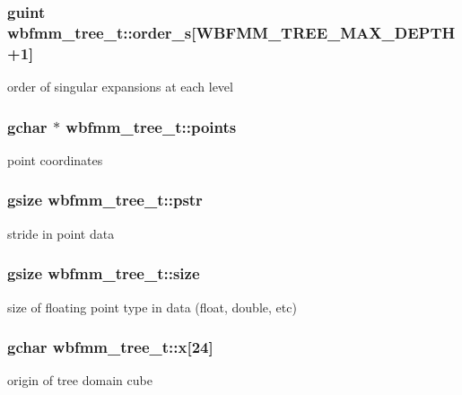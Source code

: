 \subsubsection[{order\+\_\+s}]{\setlength{\rightskip}{0pt plus 5cm}guint wbfmm\+\_\+tree\+\_\+t\+::order\+\_\+s[W\+B\+F\+M\+M\+\_\+\+T\+R\+E\+E\+\_\+\+M\+A\+X\+\_\+\+D\+E\+P\+T\+H+1]}\label{structwbfmm__tree__t_a4dcb4eecb4b78afa20215a391db8ab0e}
order of singular expansions at each level 
\subsubsection[{points}]{\setlength{\rightskip}{0pt plus 5cm}gchar $\ast$ wbfmm\+\_\+tree\+\_\+t\+::points}\label{structwbfmm__tree__t_a82a6af6a6d054522a860e1a536f6a105}
point coordinates 
\subsubsection[{pstr}]{\setlength{\rightskip}{0pt plus 5cm}gsize wbfmm\+\_\+tree\+\_\+t\+::pstr}\label{structwbfmm__tree__t_a96d1d01546cca1baf4a6a8c953ad1252}
stride in point data 
\subsubsection[{size}]{\setlength{\rightskip}{0pt plus 5cm}gsize wbfmm\+\_\+tree\+\_\+t\+::size}\label{structwbfmm__tree__t_a4bed752b3596b13ad7db8699d4f70060}
size of floating point type in data (float, double, etc) 
\subsubsection[{x}]{\setlength{\rightskip}{0pt plus 5cm}gchar wbfmm\+\_\+tree\+\_\+t\+::x[24]}\label{structwbfmm__tree__t_a44e44f2c0eabe36743d1f975b0d0798c}
origin of tree domain cube 